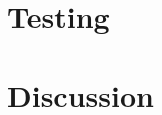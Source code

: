 \documentclass[linenumbers, twocolumn, trackchanges]{aastex631}
\begin{document}
\section{Testing}


\section{Discussion}





\appendix

{}


\end{document}
